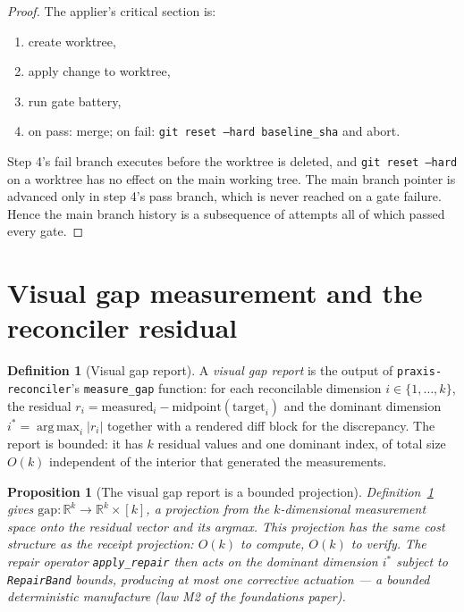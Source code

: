 \documentclass[11pt,oneside]{book}
\theoremstyle{definition}
\newtheorem{definition}{Definition}[chapter]
\theoremstyle{plain}
\newtheorem{proposition}[theorem]{Proposition}
\theoremstyle{remark}
\DeclareMathOperator*{\argmax}{arg\,max}
\newcommand{\code}[1]{\texttt{#1}}
\begin{document}
\begin{proof}
The applier's critical section is:
\begin{enumerate}
\item create worktree,
\item apply change to worktree,
\item run gate battery,
\item on pass: merge; on fail: \code{git reset --hard baseline\_sha} and abort.
\end{enumerate}
Step 4's fail branch executes before the worktree is deleted, and \code{git reset --hard}
on a worktree has no effect on the main working tree. The main branch pointer is advanced
only in step 4's pass branch, which is never reached on a gate failure. Hence the main
branch history is a subsequence of attempts all of which passed every gate.
\end{proof}

\section{Visual gap measurement and the reconciler residual}

\begin{definition}[Visual gap report]\label{def:vizgap}
A \emph{visual gap report} is the output of \code{praxis-reconciler}'s
\code{measure\_gap} function: for each reconcilable dimension $i\in\{1,\dots,k\}$, the
residual $r_i = \mathrm{measured}_i - \mathrm{midpoint}(\mathrm{target}_i)$ and the
dominant dimension $i^*=\argmax_i|r_i|$ together with a rendered diff block for the
discrepancy. The report is bounded: it has $k$ residual values and one dominant index,
of total size $O(k)$ independent of the interior that generated the measurements.
\end{definition}

\begin{proposition}[The visual gap report is a bounded projection]\label{prop:vizgap}
Definition~\ref{def:vizgap} gives $\mathrm{gap}:\mathbb{R}^k\to\mathbb{R}^k\times[k]$, a
projection from the $k$-dimensional measurement space onto the residual vector and its
argmax. This projection has the same cost structure as the receipt projection:
$O(k)$ to compute, $O(k)$ to verify. The repair operator \code{apply\_repair} then acts
on the dominant dimension $i^*$ subject to \code{RepairBand} bounds, producing at most
one corrective actuation --- a bounded deterministic manufacture (law M2 of the
foundations paper).
\end{proposition}
\end{document}
